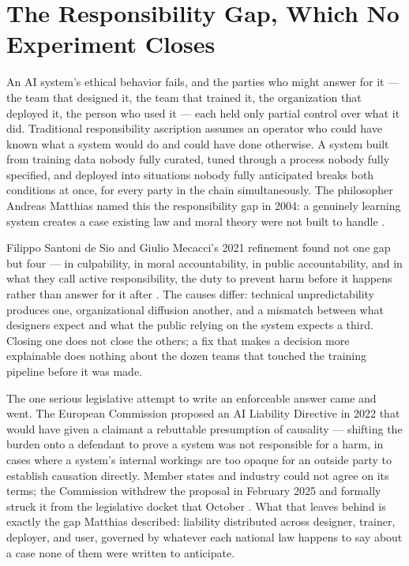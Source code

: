 \section{The Responsibility Gap, Which No Experiment Closes}
\label{sec:9.9}
An AI system's ethical behavior fails, and the parties who might answer for it — the team that designed it, the team that trained it, the organization that deployed it, the person who used it — each held only partial control over what it did. Traditional responsibility ascription assumes an operator who could have known what a system would do and could have done otherwise. A system built from training data nobody fully curated, tuned through a process nobody fully specified, and deployed into situations nobody fully anticipated breaks both conditions at once, for every party in the chain simultaneously. The philosopher Andreas Matthias named this the responsibility gap in 2004: a genuinely learning system creates a case existing law and moral theory were not built to handle \autocite{matthias2004responsibility}.

Filippo Santoni de Sio and Giulio Mecacci's 2021 refinement found not one gap but four — in culpability, in moral accountability, in public accountability, and in what they call active responsibility, the duty to prevent harm before it happens rather than answer for it after \autocite{santonidesio2021four}. The causes differ: technical unpredictability produces one, organizational diffusion another, and a mismatch between what designers expect and what the public relying on the system expects a third. Closing one does not close the others; a fix that makes a decision more explainable does nothing about the dozen teams that touched the training pipeline before it was made.

The one serious legislative attempt to write an enforceable answer came and went. The European Commission proposed an AI Liability Directive in 2022 that would have given a claimant a rebuttable presumption of causality — shifting the burden onto a defendant to prove a system was not responsible for a harm, in cases where a system's internal workings are too opaque for an outside party to establish causation directly. Member states and industry could not agree on its terms; the Commission withdrew the proposal in February 2025 and formally struck it from the legislative docket that October \autocite{europeancommission2022liability}. What that leaves behind is exactly the gap Matthias described: liability distributed across designer, trainer, deployer, and user, governed by whatever each national law happens to say about a case none of them were written to anticipate.

